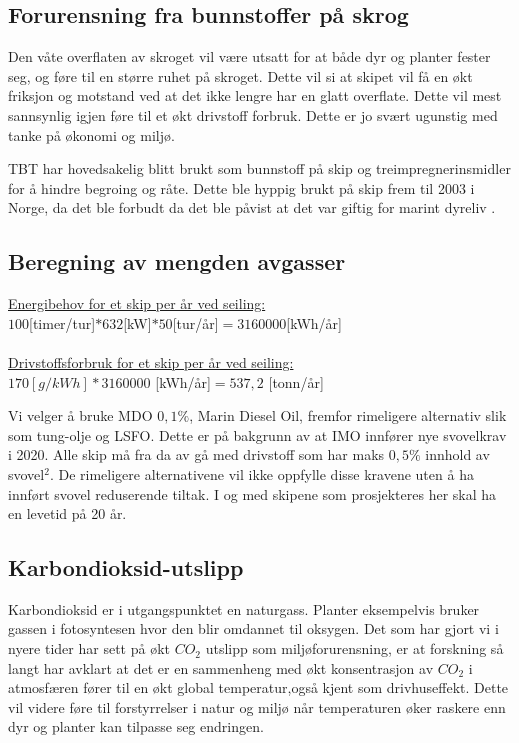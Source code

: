 \documentclass[norsk]{article}
\begin{document}
 	\subsection{Forurensning fra bunnstoffer på skrog}
Den våte overflaten av skroget vil være utsatt for at både dyr og planter fester seg, og føre til en større ruhet på skroget. Dette vil si at skipet vil få en økt friksjon og motstand ved at det ikke lengre har en glatt overflate. Dette vil mest sannsynlig igjen føre til et økt drivstoff forbruk. Dette er jo svært ugunstig med tanke på økonomi og miljø.

TBT har hovedsakelig blitt brukt som bunnstoff på skip og treimpregnerinsmidler for å hindre begroing og råte. Dette ble hyppig brukt på skip frem til 2003 i Norge, da det ble forbudt da det ble påvist at det var giftig for marint dyreliv .

	\subsection{Beregning av mengden avgasser}

\underline{Energibehov for et skip per år ved seiling:}\\
$100 $[timer/tur]$ * 632$[kW]$ * 50$[tur/år]$ = 3160000$[kWh/år]
\\\\
\underline{Drivstoffsforbruk for et skip per år ved seiling:}\\
$170 [g/kWh] * 3160000$ [kWh/år]$ = 537,2$ [tonn/år]


Vi velger å bruke MDO $0,1\%$, Marin Diesel Oil, fremfor rimeligere alternativ slik som tung-olje og LSFO. Dette er på bakgrunn av at IMO innfører nye svovelkrav i 2020. Alle skip må fra da av gå med drivstoff som har maks $0,5\%$ innhold av svovel$^2$. De rimeligere alternativene vil ikke oppfylle disse kravene uten å ha innført svovel reduserende tiltak. I og med skipene som prosjekteres her skal ha en levetid på 20 år.
    
	\subsection{Karbondioksid-utslipp}
Karbondioksid er i utgangspunktet en naturgass. Planter eksempelvis bruker gassen i fotosyntesen hvor den blir omdannet til oksygen. Det som har gjort vi i nyere tider har sett på økt $CO_2$ utslipp som miljøforurensning, er at forskning så langt har avklart at det er en sammenheng med økt konsentrasjon av $CO_2$ i atmosfæren fører til en økt global temperatur,også kjent som drivhuseffekt. Dette vil videre føre til forstyrrelser i natur og miljø når temperaturen øker raskere enn dyr og planter kan tilpasse seg endringen. 
\end{document}
